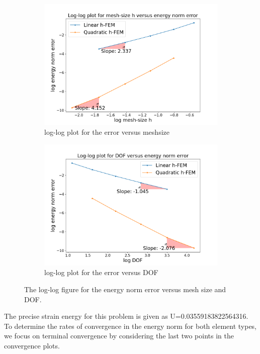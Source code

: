 \documentclass[twoside,twocolumn,10pt]{article}
\begin{document}
\begin{figure}[htbp]
  \centering
  \begin{subfigure}[b]{0.32\textwidth}
    \includegraphics[width=1.\linewidth]{Q1/logmeshsize.png}
    \caption{log-log plot for the error versus meshsize}
    \label{fig:logmeshsize}
  \end{subfigure}
  \begin{subfigure}[b]{0.32\textwidth}
    \includegraphics[width=1.\linewidth]{Q1/logDOF.png}
    \caption{log-log plot for the error versus DOF}
    \label{fig:logDOF}
  \end{subfigure}
\caption{The log-log figure for the energy norm error versus mesh size and DOF.}
\label{fig:Q1_1}
\end{figure}

The precise strain energy for this problem is given as U=0.03559183822564316. To determine the rates of convergence in the energy norm for both element types, we focus on terminal convergence by considering the last two points in the convergence plots.
\end{document}

